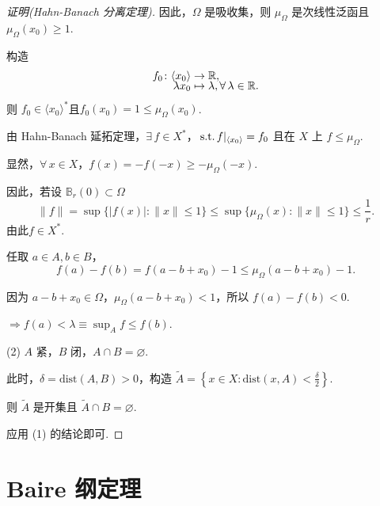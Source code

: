 \begin{proof}[证明(Hahn-Banach 分离定理)]
    \vspace{-1.3em}
    因此，$\Omega$ 是吸收集，则 $\mu_\Omega$ 是次线性泛函且 $\mu_\Omega(x_0) \geq 1$.\par
    构造 
    \begin{align*}
        f_0\colon \langle x_0 \rangle &\to \mathbb{R},\\[-6pt]
        \lambda x_0 &\mapsto \lambda, \forall\, \lambda \in \mathbb{R}.
    \end{align*}
    则 $f_0 \in \langle x_0 \rangle^*$且$f_0(x_0) = 1 \leq \mu_\Omega(x_0)$.\par
    由 Hahn-Banach 延拓定理，$\exists\, f \in X^*$，$\operatorname{\,\text{s.t.}} f|_{\langle x_0 \rangle} = f_0$ 且在 $X$ 上 $f \leq \mu_\Omega$.\par
    显然，$\forall\, x \in X$，$f(x) = -f(-x) \geq -\mu_\Omega(-x)$.\par
    因此，若设 $\mathbb{B}_r(0) \subset \Omega$
    \begin{equation*}
        \|f\| = \sup \{|f(x)|: \|x\| \leq 1\} \leq \sup \{\mu_\Omega(x): \|x\| \leq 1\} \leq \frac{1}{r}.
    \end{equation*}
    由此$f \in X^*$.\par
    任取 $a \in A, b \in B$，
    \begin{equation*}
        f(a) - f(b) = f(a-b+x_0) - 1 \leq \mu_\Omega(a-b+x_0) - 1.
    \end{equation*}\par
    因为 $a-b+x_0 \in \Omega$，$\mu_\Omega(a-b+x_0) < 1$，所以 $f(a) - f(b) < 0$.\par
    $\Rightarrow f(a) < \lambda \equiv \sup_A f \leq f(b)$.\par
    \hspace{-1.6 em}(2) $A$ 紧，$B$ 闭，$A \cap B = \varnothing$.\par
    此时，$\delta = \mathrm{dist}(A, B) > 0$，构造 $\widetilde{A} = \left\{x \in X: \mathrm{dist}(x, A) < \frac{\delta}{2}\right\}$.\par
    则 $\widetilde{A}$ 是开集且 $\widetilde{A} \cap B = \varnothing$.\par
    应用 (1) 的结论即可.
\end{proof}

\section{Baire 纲定理}

